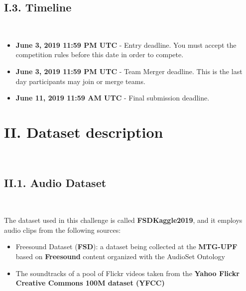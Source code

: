 \documentclass[11pt, a4papper]{report}
\theoremstyle{plain}
\theoremstyle{definition}
\theoremstyle{definition}
\theoremstyle{proposition}
\begin{document}
\section*{I.3. Timeline}
\

\begin{itemize}
\item \textbf{June 3, 2019 11:59 PM UTC} - Entry deadline. You must accept the competition rules before this date in order to compete.
\item \textbf{June 3, 2019 11:59 PM UTC} - Team Merger deadline. This is the last day participants may join or merge teams.
\item \textbf{June 11, 2019 11:59 AM UTC} - Final submission deadline.
\end{itemize}



\chapter*{II. Dataset description}
\

\section*{II.1. Audio Dataset}
\

The dataset used in this challenge is called \textbf{FSDKaggle2019}, and it employs audio clips from the following sources:
\begin{itemize}
\item Freesound Dataset (\textbf{FSD}): a dataset being collected at the \textbf{MTG-UPF} based on \textbf{Freesound} content organized with the AudioSet Ontology
\item  The soundtracks of a pool of Flickr videos taken from the \textbf{Yahoo Flickr Creative Commons 100M dataset (YFCC)}
\end{itemize}
\end{document}
